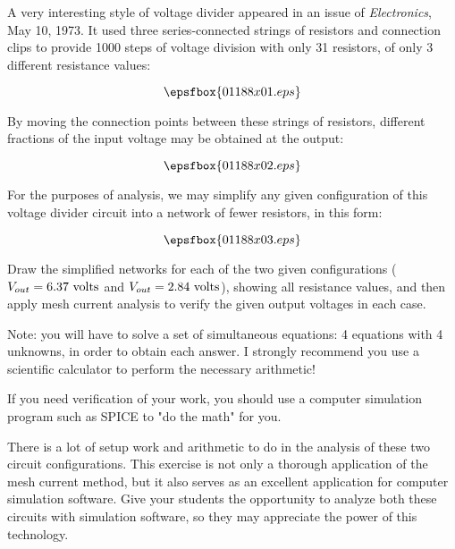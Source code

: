 

A very interesting style of voltage divider appeared in an issue of {\it Electronics}, May 10, 1973.  It used three series-connected strings of resistors and connection clips to provide 1000 steps of voltage division with only 31 resistors, of only 3 different resistance values:

$$\epsfbox{01188x01.eps}$$

By moving the connection points between these strings of resistors, different fractions of the input voltage may be obtained at the output:

$$\epsfbox{01188x02.eps}$$

For the purposes of analysis, we may simplify any given configuration of this voltage divider circuit into a network of fewer resistors, in this form:

$$\epsfbox{01188x03.eps}$$

Draw the simplified networks for each of the two given configurations ($V_{out} = 6.37 \hbox{ volts}$ and $V_{out} = 2.84 \hbox{ volts}$), showing all resistance values, and then apply mesh current analysis to verify the given output voltages in each case.

Note: you will have to solve a set of simultaneous equations: 4 equations with 4 unknowns, in order to obtain each answer.  I strongly recommend you use a scientific calculator to perform the necessary arithmetic!







If you need verification of your work, you should use a computer simulation program such as SPICE to "do the math" for you.







There is a lot of setup work and arithmetic to do in the analysis of these two circuit configurations.  This exercise is not only a thorough application of the mesh current method, but it also serves as an excellent application for computer simulation software.  Give your students the opportunity to analyze both these circuits with simulation software, so they may appreciate the power of this technology.

